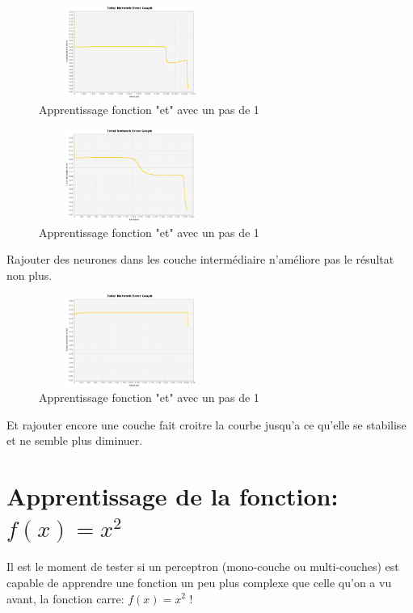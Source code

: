 \documentclass[twoside,openright,a4paper,11pt,french]{article}
\begin{document}
\begin{figure}[h]
\includegraphics[width=6cm,height=3cm]{./pics/eq/multi_6_6_def.eps}
\caption{Apprentissage fonction "et" avec un pas de 1}
\label{fig:anderr4}
\end{figure}

\begin{figure}[h]
\includegraphics[width=6cm,height=3cm]{./pics/eq/multi_3_4_def.eps}
\caption{Apprentissage fonction "et" avec un pas de 1}
\label{fig:anderr4}
\end{figure}


Rajouter des neurones dans les couche intermédiaire n'améliore pas le résultat non plus.

\begin{figure}[h]
\centering
\includegraphics[width=6cm,height=3cm]{./pics/eq/multi_3_3_3_def.eps}
\caption{Apprentissage fonction "et" avec un pas de 1}
\label{fig:anderr4}
\end{figure}


Et rajouter encore une couche fait croitre la courbe jusqu'a ce qu'elle se
stabilise et ne semble plus diminuer.


\section{Apprentissage de la fonction: $f(x) = x^2$}

Il est le moment de tester si un perceptron (mono-couche ou multi-couches) est
capable de apprendre une fonction un peu plus complexe que celle qu'on a vu avant, 
la fonction carre: $f(x) = x^2$ !\\
\end{document}
